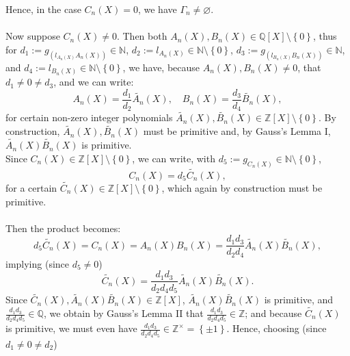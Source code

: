 \begin{solution}
\[    \]
    Hence, in the case \( C_n\left(X\right) = 0 \), we have \( \Gamma_n \neq \varnothing \).
    \\\\
    Now suppose \( C_n\left( X \right) \neq 0 \). Then both \( A_n\left( X \right), B_n\left( X \right) \in \mathbb{Q}\left[ X \right] \setminus \left\{ 0 \right\} \), thus for \( d_1 := g_{\left( l_{A_n\left( X \right)} A_n\left( X \right) \right)} \in \mathbb{N} \), \( d_2 := l_{A_n\left( X \right)} \in \mathbb{N} \setminus \left\{ 0 \right\} \), \( d_3 := g_{\left( l_{B_n\left( X \right)} B_n\left( X \right) \right)} \in \mathbb{N} \), and \( d_4 := l_{B_n\left( X \right)} \in \mathbb{N} \setminus \left\{ 0 \right\} \), we have, because \( A_n\left( X \right), B_n\left( X \right) \neq 0 \), that \( d_1 \neq 0 \neq d_3 \), and we can write:
    \[
        A_n\left( X \right) = \frac{d_1}{d_2} \widetilde{A_n}\left( X \right), \quad B_n\left( X \right) = \frac{d_3}{d_4} \widetilde{B_n}\left( X \right),
    \]
    for certain non-zero integer polynomials \( \widetilde{A_n}\left( X \right), \widetilde{B_n}\left( X \right) \in \mathbb{Z}\left[ X \right] \setminus \left\{ 0 \right\} \). By construction, \( \widetilde{A_n}\left( X \right), \widetilde{B_n}\left( X \right) \) must be primitive and, by Gauss's Lemma I, \( \widetilde{A_n}\left( X \right) \widetilde{B_n}\left( X \right) \) is primitive. \\[1em] Since \( C_n\left( X \right) \in \mathbb{Z}\left[ X \right] \setminus \left\{ 0 \right\} \), we can write, with \( d_5 := g_{C_n\left( X \right)} \in \mathbb{N} \setminus \left\{ 0 \right\} \),
    \[
        C_n\left( X \right) = d_5 \widetilde{C_n}\left( X \right),
    \]
    for a certain \( \widetilde{C_n}\left( X \right) \in \mathbb{Z}\left[ X \right] \setminus \left\{ 0 \right\} \), which again by construction must be primitive.
    \\\\
    Then the product becomes:
    \[
        d_5 \widetilde{C_n}\left( X \right) = C_n\left( X \right) = A_n\left( X \right) B_n\left( X \right) = \frac{d_1 d_3}{d_2 d_4} \widetilde{A_n}\left( X \right) \widetilde{B_n}\left( X \right),
    \]
    implying (since \( d_5 \neq 0 \))
    \[
        \widetilde{C_n}\left( X \right) = \frac{d_1 d_3}{d_2 d_4 d_5} \widetilde{A_n}\left( X \right) \widetilde{B_n}\left( X \right).
    \]
    Since \( \widetilde{C_n}\left( X \right), \widetilde{A_n}\left( X \right) \widetilde{B_n}\left( X \right) \in \mathbb{Z}\left[ X \right] \), \( \widetilde{A_n}\left( X \right) \widetilde{B_n}\left( X \right) \) is primitive, and \( \frac{d_1 d_3}{d_2 d_4 d_5} \in \mathbb{Q} \), we obtain by Gauss's Lemma II that \( \frac{d_1 d_3}{d_2 d_4 d_5} \in \mathbb{Z} \); and because \( \widetilde{C_n}\left( X \right) \) is primitive, we must even have \( \frac{d_1 d_3}{d_2 d_4 d_5} \in \mathbb{Z}^{\times} = \left\{ \pm 1 \right\} \). Hence, choosing (since \( d_1 \neq 0 \neq d_2 \))

\end{solution}
